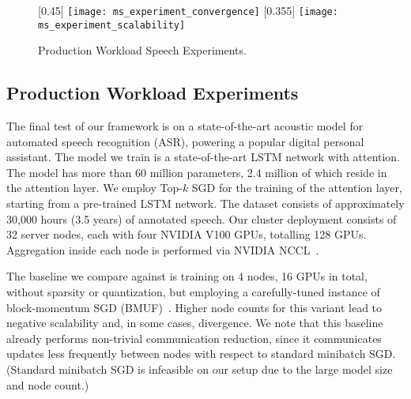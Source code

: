 \documentclass[11pt]{article}
\begin{document}

\begin{figure*}[htbp]
	\centering
	[0.45\textwidth]{
		\texttt{[image: ms\_experiment\_convergence]}
	}
	[0.355\textwidth]{
		\texttt{[image: ms\_experiment\_scalability]}
	}
	\caption{Production Workload Speech Experiments.}
	\label{fig:ProductionWorkload}
\end{figure*}

\subsection{Production Workload Experiments}

The final test of our framework is on a state-of-the-art acoustic model for automated speech recognition (ASR), powering a popular digital personal assistant. 
The model we train is a state-of-the-art LSTM network with attention. The model has more than 60 million parameters, 2.4 million of which reside in the attention layer. 
We employ Top-$k$ SGD for the training of the attention layer, starting from a pre-trained LSTM network. 
The dataset consists of approximately 30,000 hours (3.5 years) of annotated speech. 
Our cluster deployment consists of 32 server nodes, each with four NVIDIA V100 GPUs, totalling 128 GPUs. 
Aggregation inside each node is performed via NVIDIA NCCL~\cite{NCCL}. 

The baseline we compare against is training on 4 nodes, 16 GPUs in total, without sparsity or quantization, but employing a carefully-tuned instance of block-momentum SGD (BMUF)~\cite{Block-Momentum-SGD}. 
Higher node counts for this variant lead to negative scalability and, in some cases, divergence. 
We note that this baseline already performs non-trivial communication reduction, since it communicates updates less frequently between nodes with respect to standard minibatch SGD.
(Standard minibatch SGD is infeasible on our setup due to the large model size and node count.)
\end{document}
